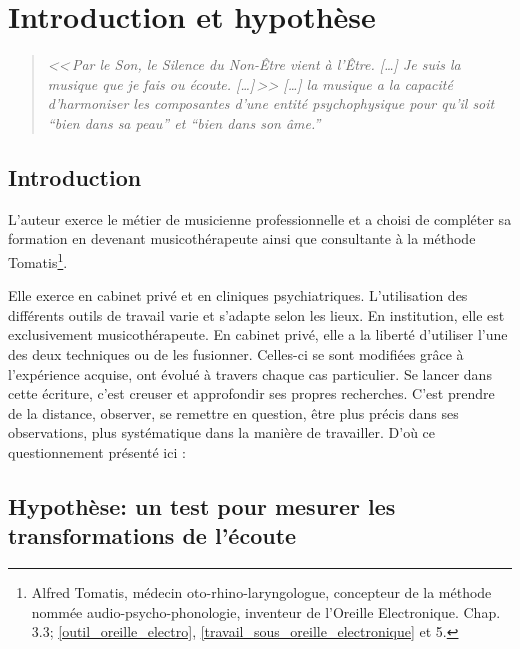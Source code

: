 \chapter{Introduction et hypothèse}

\label{jeSuisLaMusique:viret}
\begin{quotation}
\emph{<<\,\emph{Par le Son, le Silence du Non-Être vient à l'Être}. [\dots] 
\textsl{Je suis}
	\emph{la musique que je fais ou écoute}. [\dots]\,>>
[\ldots] \emph{la musique a la capacité d'harmoniser
les composantes d'une entité psychophysique pour qu'il soit ``bien
dans sa peau'' et ``bien dans son âme.}''}\, \autocite[ch. 1,  p. 8]{viret:b}
\end{quotation}

\section{Introduction}

L'auteur exerce le métier de musicienne professionnelle et a  choisi de 
compléter sa formation en devenant musicothérapeute  ainsi que consultante à la 
méthode Tomatis\footnote{Alfred Tomatis, médecin oto-rhino-laryngologue, 
concepteur de la méthode nommée audio-psycho-phonologie, inventeur de l'Oreille 
Electronique.  Chap. 3.3; \ref{outil_oreille_electro},
 \ref{travail_sous_oreille_electronique} et 5.}.  



Elle exerce en cabinet privé et en cliniques psychiatriques. L'utilisation des 
différents outils de travail varie et s'adapte selon les lieux. En institution, 
elle est exclusivement musicothérapeute. En cabinet
privé, elle a la liberté d'utiliser l'une des deux techniques ou de les 
fusionner. Celles-ci se sont modifiées grâce à  l'expérience acquise, ont 
évolué  
à travers chaque cas particulier.
 Se lancer dans cette écriture, c'est creuser et approfondir ses propres 
recherches. C'est prendre de la distance, observer, se remettre en question, 
être plus précis dans ses observations, plus systématique dans la manière de 
travailler. D'où ce questionnement présenté ici : 


\section{Hypothèse: un test pour mesurer les trans\-for\-ma\-tions de l'écoute}

